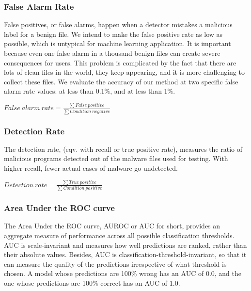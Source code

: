 \documentclass[runningheads]{llncs}
\begin{document}
\subsubsection{False Alarm Rate}

False positives, or false alarms, happen when a detector mistakes a malicious label for a benign file. We intend to make the false positive rate as low as possible, which is untypical for machine learning application. It is important because even one false alarm in a thousand benign files can create severe consequences for users. This problem is complicated by the fact that there are lots of clean files in the world, they keep appearing, and it is more challenging to collect these files. We evaluate the accuracy of our method at two specific false alarm rate values: at less than 0.1\%, and at less than 1\%.

\begin{center}
    ${False\ alarm\ rate} =  \frac{\sum False\ positive}{\sum Condition\ negative}$
\end{center}

\subsubsection{Detection Rate}

The detection rate, (eqv. with recall or true positive rate), measures the ratio of malicious programs detected out of the malware files used for testing. With higher recall, fewer actual cases of malware go undetected.

\begin{center}
    ${Detection\ rate} =  \frac{\sum True\ positive}{\sum Condition\ positive}$
\end{center}

\subsubsection{Area Under the ROC curve}

The Area Under the ROC curve, AUROC or AUC for short, provides an aggregate measure of performance across all possible classification thresholds. AUC is scale-invariant and measures how well predictions are ranked, rather than their absolute values. Besides, AUC is classification-threshold-invariant, so that it can measure the quality of the predictions irrespective of what threshold is chosen. A model whose predictions are 100\% wrong has an AUC of 0.0, and the one whose predictions are 100\% correct has an AUC of 1.0.
\end{document}
